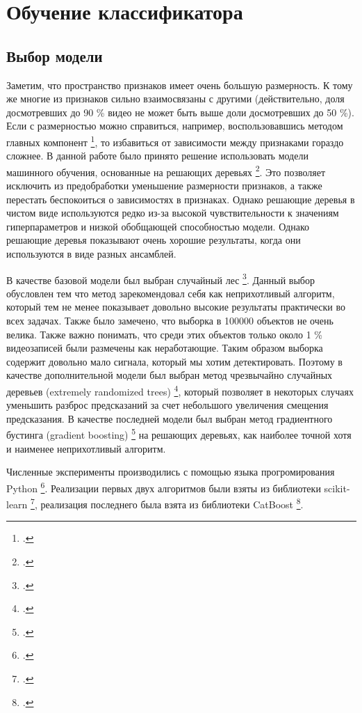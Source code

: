\chapter{Обучение классификатора}

\section{Выбор модели}

Заметим, что пространство признаков имеет очень большую размерность. К тому же многие из признаков сильно взаимосвязаны с другими (действительно, доля досмотревших до 90 \% видео не может быть выше доли досмотревших до 50 \%). Если с размерностью можно справиться, например, воспользовавшись методом главных компонент \footcite{Pearson1901}, то избавиться от зависимости между признаками гораздо сложнее. В данной работе было принято решение использовать модели машинного обучения, основанные на решающих деревьях \footcite{LeoConsultant1984}. Это позволяет исключить из предобработки уменьшение размерности признаков, а также перестать беспокоиться о зависимостях в признаках. Однако решающие деревья в чистом виде используются редко из-за высокой чувствительности к значениям гиперпараметров и низкой обобщающей способностью модели. Однако решающие деревья показывают очень хорошие результаты, когда они используются в виде разных ансамблей.

В качестве базовой модели был выбран случайный лес \footcite{Ho}. Данный выбор обусловлен тем что метод зарекомендовал себя как неприхотливый алгоритм, который тем не менее показывает довольно высокие результаты практически во всех задачах. Также было замечено, что выборка в 100000 объектов не очень велика. Также важно понимать, что среди этих объектов только около 1 \% видеозаписей были размечены как неработающие. Таким образом выборка содержит довольно мало сигнала, который мы хотим детектировать. Поэтому в качестве дополнительной модели был выбран метод чрезвычайно случайных деревьев (extremely randomized trees) \footcite{Geurts2006}, который позволяет в некоторых случаях уменьшить разброс предсказаний за счет небольшого увеличения смещения предсказания. В качестве последней модели был выбран метод градиентного бустинга (gradient boosting) \footcite{Friedman2001} на решающих деревьях, как наиболее точной хотя и наименее неприхотливый алгоритм.

Численные эксперименты производились с помощью языка прогромирования Python \footcite{Python}. Реализации первых двух алгоритмов были взяты из библиотеки scikit-learn \footcite{scikit-learn}, реализация последнего была взята из библиотеки CatBoost \footcite{Prokhorenkova2017}.

